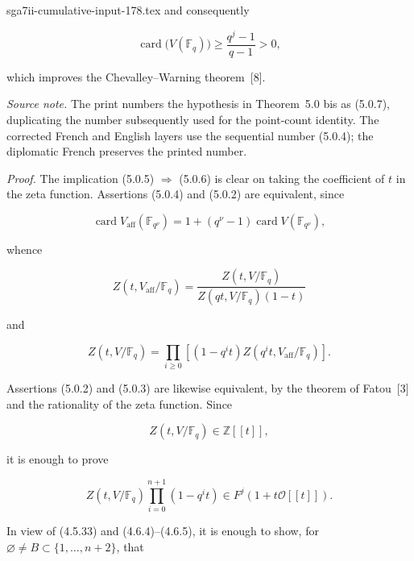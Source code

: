 \begin{filecontents*}{sga7ii-cumulative-input-178.tex}
and consequently

\begin{equation}\tag{5.0.6 bis}
\operatorname{card}\bigl(V(\mathbb F_q)\bigr)
\geq\frac{q^j-1}{q-1}>0,
\end{equation}

\noindent
which improves the Chevalley--Warning theorem~[8].

\medskip
\noindent\emph{Source note.}
The print numbers the hypothesis in Theorem~5.0 bis as (5.0.7), duplicating
the number subsequently used for the point-count identity.  The corrected
French and English layers use the sequential number (5.0.4); the diplomatic
French preserves the printed number.

\medskip
\noindent\emph{Proof.}
The implication (5.0.5) $\Rightarrow$ (5.0.6) is clear on taking the
coefficient of $t$ in the zeta function.  Assertions (5.0.4) and (5.0.2)
are equivalent, since

\begin{equation}\tag{5.0.7}
\operatorname{card}V_{\mathrm{aff}}(\mathbb F_{q^\nu})
=1+(q^\nu-1)\operatorname{card}V(\mathbb F_{q^\nu}),
\end{equation}

whence

\begin{equation}\tag{5.0.8}
Z(t,V_{\mathrm{aff}}/\mathbb F_q)
=\frac{Z(t,V/\mathbb F_q)}
{Z(qt,V/\mathbb F_q)(1-t)}
\end{equation}

and

\begin{equation}\tag{5.0.9}
Z(t,V/\mathbb F_q)
=\prod_{i\geq0}
\left[(1-q^it)Z(q^it,V_{\mathrm{aff}}/\mathbb F_q)\right].
\end{equation}

\noindent
Assertions (5.0.2) and (5.0.3) are likewise equivalent, by the theorem of
Fatou~[3] and the rationality of the zeta function.  Since

\begin{equation}\tag{5.0.10}
Z(t,V/\mathbb F_q)\in\mathbb Z[[t]],
\end{equation}

it is enough to prove

\begin{equation}\tag{5.0.11}
Z(t,V/\mathbb F_q)\prod_{i=0}^{n+1}(1-q^it)
\in F^j(1+t\mathcal O[[t]]).
\end{equation}

In view of (4.5.33) and (4.6.4)--(4.6.5), it is enough to show, for
$\varnothing\ne B\subset\{1,\ldots,n+2\}$, that


\end{filecontents*}

